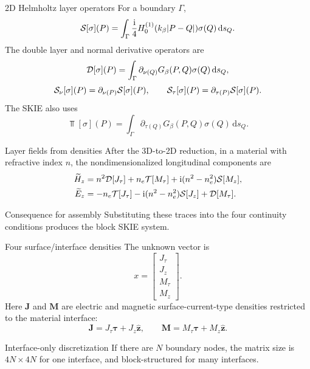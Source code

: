 \documentclass[aspectratio=169,10pt]{beamer}
\newcommand{\dd}{\,\mathrm d}
\newcommand{\ii}{\mathrm i}
\newcommand{\tvec}{\bm{\tau}}
\newcommand{\J}{\bm{J}}
\newcommand{\M}{\bm{M}}
\begin{document}
\begin{frame}{2D Helmholtz layer operators}
\small
For a boundary $\Gamma$,
\[
  \Sop[\sigma](P)=\int_\Gamma
  \frac{\ii}{4}H_0^{(1)}(k_\beta|P-Q|)
  \sigma(Q)\dd s_Q.
\]
The double layer and normal derivative operators are
\[
  \Dop[\sigma](P)=\int_\Gamma
  \partial_{\nu(Q)}G_\beta(P,Q)\sigma(Q)\dd s_Q,
\]
\[
  \mathcal{S}_\nu[\sigma](P)=\partial_{\nu(P)}\mathcal{S}[\sigma](P),
  \qquad
  \mathcal{S}_\tau[\sigma](P)=\partial_{\tau(P)}\mathcal{S}[\sigma](P).
\]
The SKIE also uses
\[
  \Top[\sigma](P)=\int_\Gamma
  \partial_{\tau(Q)}G_\beta(P,Q)\sigma(Q)\dd s_Q.
\]
\end{frame}

\begin{frame}{Layer fields from densities}
\small
After the 3D-to-2D reduction, in a material with refractive index $n$, the
nondimensionalized longitudinal components are
\[
\begin{aligned}
\widetilde H_z
&=n^2\Dop[J_\tau]
  +n_e\Top[M_\tau]
  +\ii(n^2-n_e^2)\Sop[M_z],\\
\widetilde E_z
&=-n_e\Top[J_\tau]
  -\ii(n^2-n_e^2)\Sop[J_z]
  +\Dop[M_\tau].
\end{aligned}
\]

\begin{block}{Consequence for assembly}
Substituting these traces into the four continuity conditions produces the
block SKIE system.
\end{block}
\end{frame}

\begin{frame}{Four surface/interface densities}
\small
The unknown vector is
\[
  x=
  \begin{bmatrix}
  J_\tau\\ J_z\\ M_\tau\\ M_z
  \end{bmatrix}.
\]
Here $\J$ and $\M$ are electric and magnetic surface-current-type densities
restricted to the material interface:
\[
  \J=J_\tau\tvec+J_z\hat{\bm z},
  \qquad
  \M=M_\tau\tvec+M_z\hat{\bm z}.
\]

\begin{block}{Interface-only discretization}
If there are $N$ boundary nodes, the matrix size is $4N\times4N$ for one
interface, and block-structured for many interfaces.
\end{block}
\end{frame}
\end{document}
